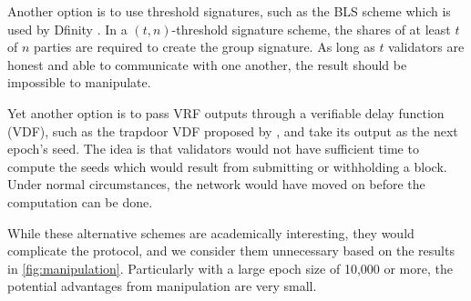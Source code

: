 Another option is to use threshold signatures, such as the BLS scheme which is used by Dfinity \cite{hanke2018dfinity}. In a $(t,n)$-threshold signature scheme, the shares of at least $t$ of $n$ parties are required to create the group signature. As long as $t$ validators are honest and able to communicate with one another, the result should be impossible to manipulate.

Yet another option is to pass VRF outputs through a verifiable delay function (VDF), such as the trapdoor VDF proposed by \cite{wesolowski2018efficient}, and take its output as the next epoch's seed. The idea is that validators would not have sufficient time to compute the seeds which would result from submitting or withholding a block. Under normal circumstances, the network would have moved on before the computation can be done.

While these alternative schemes are academically interesting, they would complicate the protocol, and we consider them unnecessary based on the results in \autoref{fig:manipulation}. Particularly with a large epoch size of 10,000 or more, the potential advantages from manipulation are very small.
